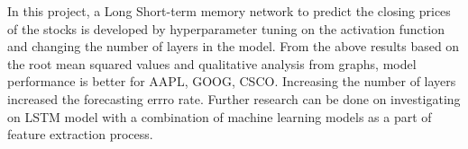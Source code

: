 In this project, a Long Short-term memory network to predict the closing prices of the stocks is developed by hyperparameter tuning on the activation function and changing the number of layers in the model. From the above results based on the root mean squared values and qualitative analysis from graphs, model performance is better for AAPL, GOOG, CSCO. Increasing the number of layers increased the forecasting errro rate. Further research can be done on investigating on LSTM model with a combination of machine learning models as a part of feature extraction process.




